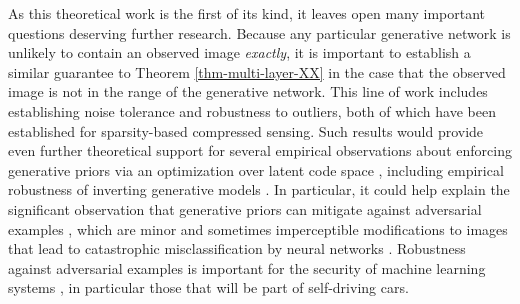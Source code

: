 \documentclass[11pt]{article}
\newcommand{\red}[1]{{\color{black} #1}}
\begin{document}


As this theoretical work is the first of its kind, it leaves open many important questions deserving further research.  Because any particular generative network is unlikely to contain an observed image \textit{exactly}, it is important to establish a similar guarantee to Theorem \ref{thm-multi-layer-XX} in the case that the observed image is not in the range of the generative network.  This line of work includes establishing noise tolerance and robustness to outliers, both of which have been established for sparsity-based compressed sensing. Such results would provide even further theoretical support for several empirical observations about enforcing generative priors via an optimization over latent code space \cite{Price, zhu2016generative}, including empirical robustness of inverting generative models \cite{lipton2017precise}.  In particular, it could help explain the significant observation that generative priors can mitigate against adversarial examples \cite{ilyas2017robust, song2017pixeldefend}, which are minor and sometimes imperceptible modifications to images that lead to catastrophic misclassification by neural networks \cite{szegedy2013intriguing}.  Robustness against adversarial examples is important for the security of machine learning systems \cite{yuan2017adversarial, akhtar2018threat}, in particular those that will be part of self-driving cars.  
\end{document}
